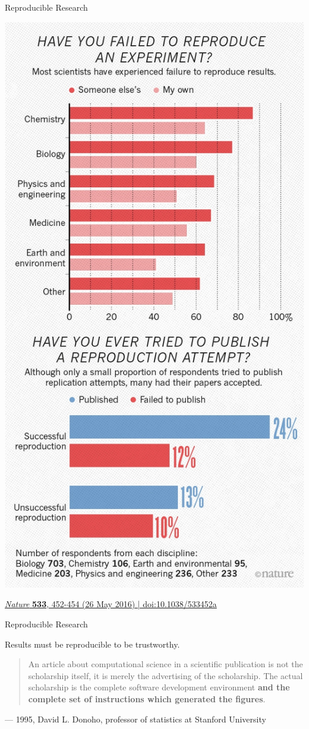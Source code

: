\documentclass{beamer}
\begin{document}
\begin{frame}[noframenumbering]{Reproducible Research}
    \begin{center}
        \includegraphics[trim=0 550 0 15, clip, width=.71\textwidth]{nature-reproducibility-breakdown.jpg}
    \end{center}
\vspace{-0.5cm}
{\footnotesize \href{https://www.nature.com/news/1-500-scientists-lift-the-lid-on-reproducibility-1.19970}{\textit{Nature} \textbf{533}, 452-454 (26 May 2016) | doi:10.1038/533452a}}
\vfill
\end{frame}

\begin{frame}{Reproducible Research}
\begin{alertblock}{Results must be reproducible to be trustworthy.}
\begin{quote}
    An article about computational science in a scientific publication is not the scholarship itself, it is merely the advertising of the scholarship. The actual scholarship is the complete software development environment \textbf{and the complete set of instructions which generated the figures}.
\end{quote}
\end{alertblock}
--- 1995, David L. Donoho, professor of statistics at Stanford University
\vfill
\end{frame}
\end{document}
